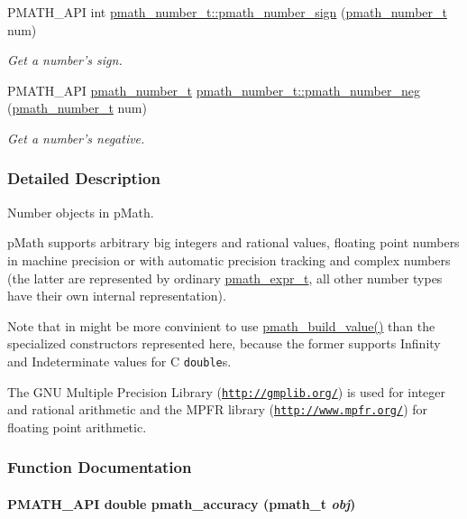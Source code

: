 \begin{CompactItemize}
PMATH\_\-API int \hyperlink{group__numbers_g7a736f04d207d140b3b052438cc371d0}{pmath\_\-number\_\-t::pmath\_\-number\_\-sign} (\hyperlink{classpmath__number__t}{pmath\_\-number\_\-t} num)
\begin{CompactList}\small\item\em Get a number's sign. \item\end{CompactList}\item 
PMATH\_\-API \hyperlink{classpmath__number__t}{pmath\_\-number\_\-t} \hyperlink{group__numbers_gfbfb5ee7f7cd966432e1cee6fa5b6bf5}{pmath\_\-number\_\-t::pmath\_\-number\_\-neg} (\hyperlink{classpmath__number__t}{pmath\_\-number\_\-t} num)
\begin{CompactList}\small\item\em Get a number's negative. \item\end{CompactList}\end{CompactItemize}


\subsubsection{Detailed Description}
Number objects in pMath. 

pMath supports arbitrary big integers and rational values, floating point numbers in machine precision or with automatic precision tracking and complex numbers (the latter are represented by ordinary \hyperlink{classpmath__expr__t}{pmath\_\-expr\_\-t}, all other number types have their own internal representation).

Note that in might be more convinient to use \hyperlink{group__helpers_g13a748aa283c5f5408cce037d3ad224d}{pmath\_\-build\_\-value()} than the specialized constructors represented here, because the former supports Infinity and Indeterminate values for C {\tt double}s.

The GNU Multiple Precision Library (\href{http://gmplib.org/}{\tt http://gmplib.org/}) is used for integer and rational arithmetic and the MPFR library (\href{http://www.mpfr.org/}{\tt http://www.mpfr.org/}) for floating point arithmetic. 

\subsubsection{Function Documentation}
\hypertarget{group__numbers_g801920d9e9a6b4c04fa45e664a82dc10}{
\paragraph[{pmath\_\-accuracy}]{\setlength{\rightskip}{0pt plus 5cm}PMATH\_\-API double pmath\_\-accuracy ({\bf pmath\_\-t} {\em obj})}\hfill}
\label{group__numbers_g801920d9e9a6b4c04fa45e664a82dc10}


